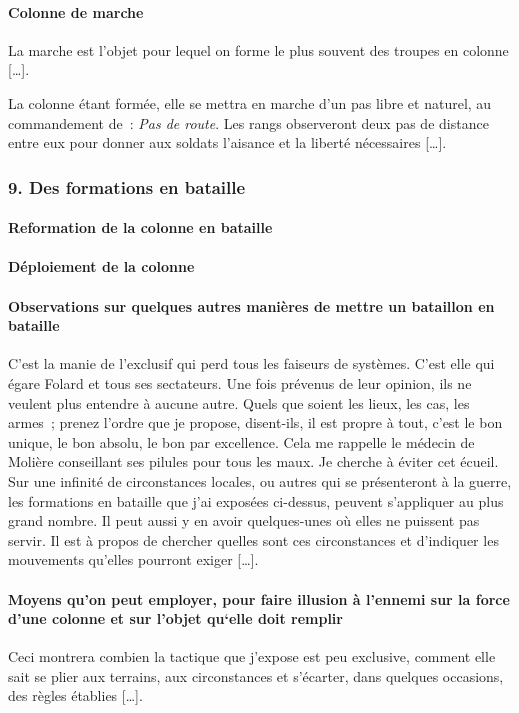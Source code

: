 \documentclass[french,twoside]{book} %
\begin{document}
\paragraph[{Colonne de marche}]{Colonne de marche}
\noindent La marche est l’objet pour lequel on forme le plus souvent des troupes en colonne […].\par
La colonne étant formée, elle se mettra en marche d’un pas libre et naturel, au commandement de : {\itshape Pas de route}. Les rangs observeront deux pas de distance entre eux pour donner aux soldats l’aisance et la liberté nécessaires […].
\subsubsection[{9. Des formations en bataille}]{9. Des formations en bataille}
\noindent […]\par
\paragraph[{Reformation de la colonne en bataille}]{Reformation de la colonne en bataille}
\noindent […]
\paragraph[{Déploiement de la colonne}]{Déploiement de la colonne}
\noindent […]
\paragraph[{Observations sur quelques autres manières de mettre un bataillon en bataille}]{Observations sur quelques autres manières de mettre un bataillon en bataille}
\noindent C’est la manie de l’exclusif qui perd tous les faiseurs de systèmes. C’est elle qui égare Folard et tous ses sectateurs. Une fois prévenus de leur opinion, ils ne veulent plus entendre à aucune autre. Quels que soient les lieux, les cas, les armes ; prenez l’ordre que je propose, disent-ils, il est propre à tout, c’est le bon unique, le bon absolu, le bon par excellence. Cela me rappelle le médecin de Molière conseillant ses pilules pour tous les maux. Je cherche à éviter cet écueil. Sur une infinité de circonstances locales, ou autres qui se présenteront à la guerre, les formations en bataille que j’ai exposées ci-dessus, peuvent s’appliquer au plus grand nombre. Il peut aussi y en avoir quelques-unes où elles ne puissent pas servir. Il est à propos de chercher quelles sont ces circonstances et d’indiquer les mouvements qu’elles pourront exiger […].
\paragraph[{Moyens qu’on peut employer, pour faire illusion à l’ennemi sur la force d’une colonne et sur l’objet qu‘elle doit remplir}]{Moyens qu’on peut employer, pour faire illusion à l’ennemi sur la force d’une colonne et sur l’objet qu‘elle doit remplir}
\noindent Ceci montrera combien la tactique que j’expose est peu exclusive, comment elle sait se plier aux terrains, aux circonstances et s’écarter, dans quelques occasions, des règles établies […].
\end{document}
